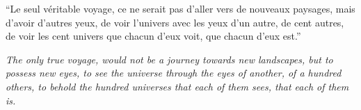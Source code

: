 \begin{savequote}[75mm]
\onehalfspacing
\textnormal{``Le seul v\'{e}ritable voyage, ce ne serait pas d'aller vers de nouveaux paysages, mais d'avoir d'autres yeux, de voir l'univers avec les yeux d'un autre, de cent autres, de voir les cent univers que chacun d'eux voit, que chacun d'eux est.''} 

\vspace{16pt} 

\textit{The only true voyage, would not be a journey towards new landscapes, but to possess new eyes, to see the universe through the eyes of another, of a hundred others, to behold the hundred universes that each of them sees, that each of them is.}
\end{savequote}

